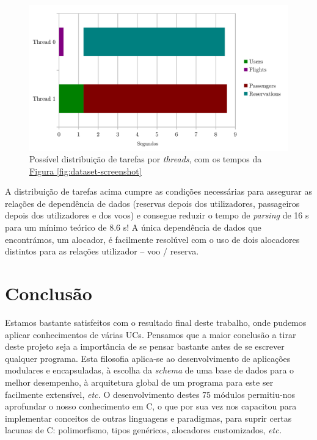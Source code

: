 \documentclass[11pt, a4paper]{article}
\begin{document}
\begin{figure}[h]
    \centering
    \includegraphics[scale=0.20]{res-fase2/threading.png}
    \caption{Possível distribuição de tarefas por \emph{threads}, com os tempos da
             \hyperref[fig:dataset-screenshot]{Figura \ref*{fig:dataset-screenshot}}}
    \label{fig:threading}
\end{figure}

A distribuição de tarefas acima cumpre as condições necessárias para assegurar as relações de
dependência de dados (reservas depois dos utilizadores, passageiros depois dos utilizadores e dos
voos) e consegue reduzir o tempo de \emph{parsing} de 16 s para um mínimo teórico de 8.6 s! A única
dependência de dados que encontrámos, um alocador, é facilmente resolúvel com o uso de dois
alocadores distintos para as relações utilizador -- voo / reserva.

\section{Conclusão}
\label{sec:conclusion}

Estamos bastante satisfeitos com o resultado final deste trabalho, onde pudemos aplicar
conhecimentos de várias UCs. Pensamos que a maior conclusão a tirar deste projeto seja a importância
de se pensar bastante antes de se escrever qualquer programa. Esta filosofia aplica-se ao
desenvolvimento de aplicações modulares e encapsuladas, à escolha da \emph{schema} de uma base de
dados para o melhor desempenho, à arquitetura global de um programa para este ser facilmente
extensível, \emph{etc.} O desenvolvimento destes 75 módulos permitiu-nos aprofundar o nosso
conhecimento em C, o que por sua vez nos capacitou para implementar conceitos de outras linguagens e
paradigmas, para suprir certas lacunas de C: polimorfismo, tipos genéricos, alocadores customizados,
\emph{etc.}
\end{document}
